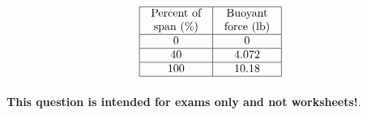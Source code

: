 $$\vbox{\offinterlineskip
\halign{\strut
\vrule \quad\hfil # \ \hfil & 
\vrule \quad\hfil # \ \hfil \vrule \cr
\noalign{\hrule}
%
Percent of & Buoyant  \cr
%
span (\%) & force (lb) \cr
%
\noalign{\hrule}
%
0 & 0 \cr
%
\noalign{\hrule}
%
40 & 4.072 \cr
%
\noalign{\hrule}
%
100 & 10.18 \cr
%
\noalign{\hrule}
} %
}$$ %







{\bf This question is intended for exams only and not worksheets!}.



